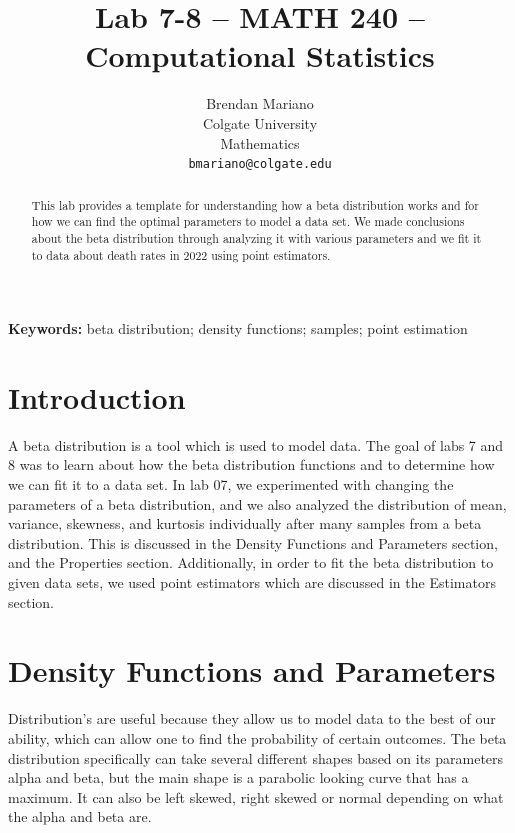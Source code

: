 \documentclass{article}\usepackage[]{graphicx}\usepackage[]{xcolor}
\begin{document}
\vspace{-1in}
\title{Lab 7-8 -- MATH 240 -- Computational Statistics}

\author{
  Brendan Mariano \\
  Colgate University  \\
  Mathematics  \\
  {\tt bmariano@colgate.edu}
}

\date{}

\maketitle

\begin{multicols}{2}
\begin{abstract}
This lab provides a template for understanding how a beta distribution works and for how we can find the optimal parameters to model a data set. We made conclusions about the beta distribution through analyzing it with various parameters and we fit it to data about death rates in 2022 using point estimators.

\end{abstract}

\noindent \textbf{Keywords:} beta distribution; density functions; samples; point estimation

\section{Introduction}
A beta distribution is a tool which is used to model data. The goal of labs 7 and 8 was to learn about how the beta distribution functions and to determine how we can fit it to a data set. In lab 07, we experimented with changing the parameters of a beta distribution, and we also analyzed the distribution of mean, variance, skewness, and kurtosis individually after many samples from a beta distribution. This is discussed in the Density Functions and Parameters section, and the Properties section. Additionally, in order to fit the beta distribution to given data sets, we used point estimators which are discussed in the Estimators section. 


\section{Density Functions and Parameters}
  Distribution's are useful because they allow us to model data to the best of our ability, which can allow one to find the probability of certain outcomes. The beta distribution specifically can take several different shapes based on its parameters alpha and beta,  but the main shape is a parabolic looking curve that has a maximum. It can also be left skewed, right skewed or normal depending on what the alpha and beta are. 


\end{multicols}
\end{document}
